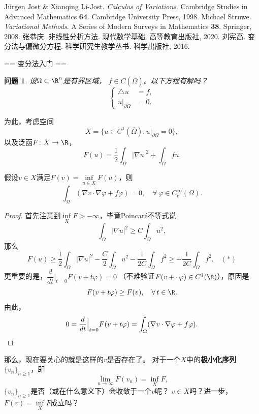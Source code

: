 \theoremstyle{plain}\newtheorem*{problem}{问题}

\begin{references}
    Jürgen Jost \& Xianqing Li-Jost. \textit{Calculus of Variations}.
    Cambridge Studies in Advanced Mathematics \textbf{64}. 
    Cambridge University Press, 1998.
    Michael Struwe. \textit{Variational Methods}.
    A Series of Modern Surveys in Mathematics \textbf{38}. 
    Springer, 2008.
    张恭庆. 非线性分析方法. 现代数学基础. 高等教育出版社, 2020.
    刘宪高. 变分法与偏微分方程. 科学研究生教学丛书. 科学出版社, 2016.
\end{references}

== 变分法入门 ==

\begin{problem}
    设$\Omega\subset\R^n$是有界区域，
    $f\in C(\overline{\Omega})$。以下方程有解吗？
    \begin{equation*}
        \left\{\begin{aligned}
            \triangle u&=f,\\
            u|_{\partial\Omega}&=0.
        \end{aligned}\right.
    \end{equation*}
\end{problem}
为此，考虑空间
\[X=\{u\in C^1(\overline{\Omega}): u|_{\partial\Omega}=0\},\]
以及泛函$F\colon X\to\R$，
\[F(u)=\frac{1}{2}\int_\Omega|\nabla u|^2+\int_\Omega fu.\]
\begin{proposition}\label{int}
    假设$v\in X$满足$F(v)=\inf\limits_{u\in X}F(u)$，则
    \[\int_\Omega(\nabla v\cdot\nabla\varphi+f\varphi)=0,
    \quad\forall\,\varphi\in C_c^\infty(\Omega).\]
\end{proposition}
\begin{proof}
    首先注意到$\inf\limits_X F>-\infty$，毕竟Poincaré不等式说
    \[\int_\Omega|\nabla u|^2\ge C\int_\Omega u^2,\]
    那么
    \[F(u)\ge\frac{1}{2}\int_\Omega|\nabla u|^2
    -\frac{C}{2}\int_\Omega u^2-\frac{1}{2C}\int_\Omega f^2
    \ge-\frac{1}{2C}\int_\Omega f^2.\quad(*)\]
    更重要的是，$\dfrac{d}{dt}\Big|_{t=0}F(v+t\varphi)=0$
    （不难验证$F(v+\cdot\,\varphi)\in C^1(\R)$），原因是
    \[F(v+t\varphi)\ge F(v),\quad\forall\,t\in\R.\]
    由此，
    \[0=\frac{d}{dt}\Big|_{t=0}F(v+t\varphi)
    =\int_\Omega(\nabla v\cdot\nabla\varphi+f\varphi).\qedhere\]
\end{proof}
那么，现在要关心的就是这样的$v$是否存在了。
对于一个$X$中的\textbf{极小化序列}$\{v_n\}_{n\ge1}$，即
\[\lim_{n\to\infty}F(v_n)=\inf_X F,\]
$\{v_n\}_{n\ge1}$是否（或在什么意义下）会收敛于一个$v$呢？
$v\in X$吗？进一步，$F(v)=\inf\limits_X F$成立吗？

